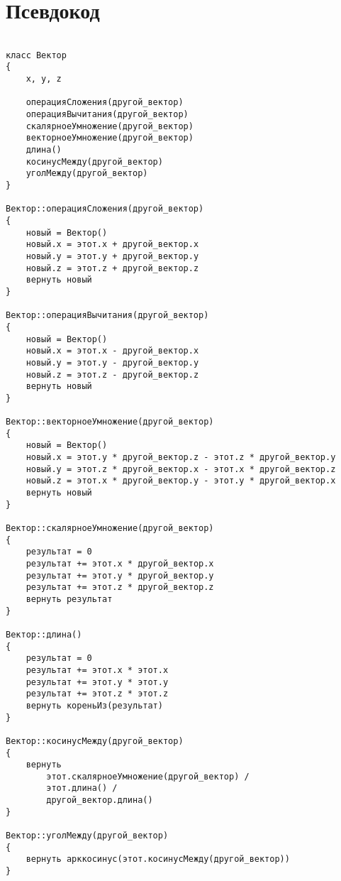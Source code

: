 \label{sec:pseudocode}
\section{Псевдокод}

{
\fontsize{10pt}{12pt}\selectfont
\begin{verbatim}

класс Вектор
{
    x, y, z

    операцияСложения(другой_вектор)
    операцияВычитания(другой_вектор)
    скалярноеУмножение(другой_вектор)
    векторноеУмножение(другой_вектор)
    длина()
    косинусМежду(другой_вектор)
    уголМежду(другой_вектор)
}

Вектор::операцияСложения(другой_вектор)
{
    новый = Вектор()
    новый.x = этот.x + другой_вектор.x
    новый.y = этот.y + другой_вектор.y
    новый.z = этот.z + другой_вектор.z
    вернуть новый
}

Вектор::операцияВычитания(другой_вектор)
{
    новый = Вектор()
    новый.x = этот.x - другой_вектор.x
    новый.y = этот.y - другой_вектор.y
    новый.z = этот.z - другой_вектор.z
    вернуть новый
}

Вектор::векторноеУмножение(другой_вектор)
{
    новый = Вектор()
    новый.x = этот.y * другой_вектор.z - этот.z * другой_вектор.y
    новый.y = этот.z * другой_вектор.x - этот.x * другой_вектор.z
    новый.z = этот.x * другой_вектор.y - этот.y * другой_вектор.x
    вернуть новый
}

Вектор::скалярноеУмножение(другой_вектор)
{
    результат = 0
    результат += этот.x * другой_вектор.x
    результат += этот.y * другой_вектор.y
    результат += этот.z * другой_вектор.z
    вернуть результат
}

Вектор::длина()
{
    результат = 0
    результат += этот.x * этот.x
    результат += этот.y * этот.y
    результат += этот.z * этот.z
    вернуть кореньИз(результат)
}

Вектор::косинусМежду(другой_вектор)
{
    вернуть
        этот.скалярноеУмножение(другой_вектор) /
        этот.длина() /
        другой_вектор.длина()
}

Вектор::уголМежду(другой_вектор)
{
    вернуть арккосинус(этот.косинусМежду(другой_вектор))
}

\end{verbatim}
}